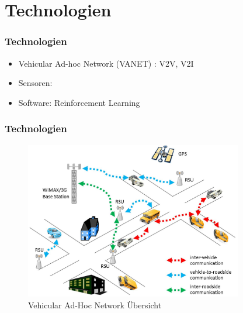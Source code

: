 \section{Technologien}


\begin{frame}
    \frametitle{Technologien}

    
    \begin{itemize}
        \item Vehicular Ad-hoc Network (VANET) \cite{10.1007/978-3-642-31368-4_6}: V2V, V2I
        \item Sensoren:
        \item Software: Reinforcement Learning
    \end{itemize}

\end{frame}

\begin{frame}
    \frametitle{Technologien}

    
    \begin{figure}[H]
        \centering
        \includegraphics[width=0.85\textwidth]{resources/images/VANET.jpg}
        \caption{Vehicular Ad-Hoc Network Übersicht \cite{vanet1_img}}
    \end{figure}
\end{frame}